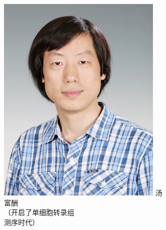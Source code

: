 \documentclass[11pt]{ctexbeamer}
\begin{document}
\begin{frame}
\begin{columns}
\begin{figure}
    \includegraphics[width=\textwidth]{people_Tang.png}
    汤富酬\\
    （开启了单细胞转录组\\测序时代）
  \end{figure}
   \begin{figure}
    \centering

\end{figure}
\end{columns}
\end{frame}
\end{document}
